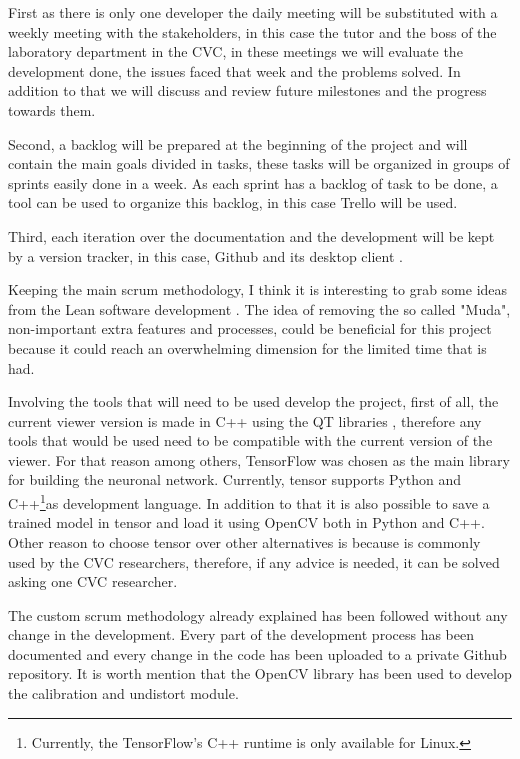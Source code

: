 \documentclass[10pt,a4paper,twocolumn,twoside]{article}
\begin{document}
	First as there is only one developer the daily meeting will be substituted with a weekly meeting with the stakeholders, in this case the tutor and the boss of the laboratory department in the CVC, in these meetings we will evaluate the development done, the issues faced that week and the problems solved. In addition to that we will discuss and review future milestones and the progress towards them.
	
	Second, a backlog will be prepared at the beginning of the project and will contain the main goals divided in tasks, these tasks will be organized in groups of sprints easily done in a week. As each sprint has a backlog of task to be done, a tool can be used to organize this backlog, in this case Trello\cite{web:trello} will be used.
	
	Third, each iteration over the documentation and the development will be kept by a version tracker, in this case, Github \cite{web:github} and its desktop client \cite{web:githubDesktop}. 
	
	Keeping the main scrum methodology, I think it is interesting to grab some ideas from the Lean software development \cite{web:leanMethod}. The idea of removing the so called "Muda", non-important extra features and processes, could be beneficial for this project because it could reach an overwhelming dimension for the limited time that is had.
	
	Involving the tools that will need to be used develop the project, first of all, the current viewer version is made in C++ using the QT libraries \cite{web:qt}, therefore any tools that would be used need to be compatible with the current version of the viewer. For that reason among others, TensorFlow\cite{web:tensor} was chosen as the main library for building the neuronal network. Currently, tensor supports  Python and C++\footnote{Currently, the TensorFlow's C++ runtime is only available for Linux.}as development language. In addition to that it is also possible to save a trained model in tensor and load it using OpenCV both in Python and C++. Other reason to choose tensor over other alternatives is because is commonly used by the CVC researchers, therefore, if any advice is needed, it can be solved asking one CVC researcher.
	
	The custom scrum methodology already explained has been followed without any change in the development. Every part of the development process has been documented and every change in the code has been uploaded to a private Github repository. It is worth mention that the OpenCV \cite{web:opencv} library has been used to develop the calibration and undistort module. 
	
\end{document}
